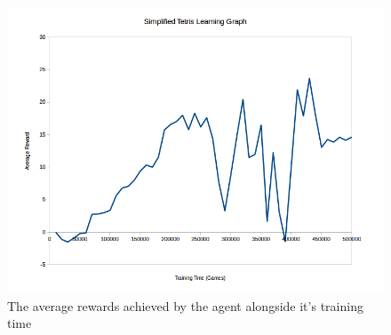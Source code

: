      \begin{figure}[H]
        \centering
        \includegraphics[scale=0.5]{images/tetrisreward.png}
        \caption{The average rewards achieved by the agent alongside it's training time}
        \label{fig:tetris1}
    \end{figure}
    
